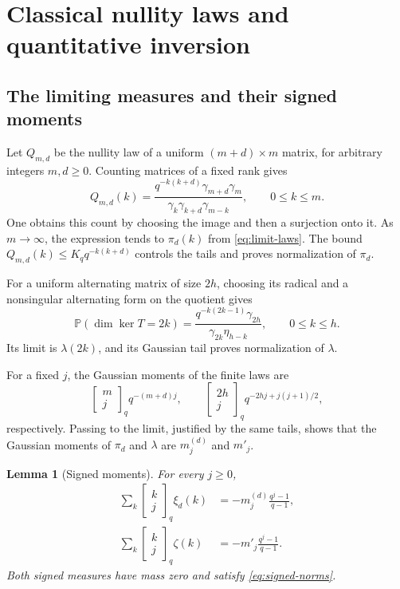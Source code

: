 \documentclass[11pt]{article}
\newtheorem{lemma}[theorem]{Lemma}
\theoremstyle{definition}
\theoremstyle{remark}
\newcommand{\Pp}{\mathbb P}
\newcommand{\gb}[2]{\begin{bmatrix}#1\\#2\end{bmatrix}_{q}}
\begin{document}
\section{Classical nullity laws and quantitative inversion}\label{sec:inversion}

\subsection{The limiting measures and their signed moments}

Let $Q_{m,d}$ be the nullity law of a uniform $(m+d)\times m$ matrix, for arbitrary integers $m,d\ge0$. Counting matrices of a fixed rank gives
\begin{equation}\label{eq:rectangular-finite}
 Q_{m,d}(k)=
 \frac{q^{-k(k+d)}\gamma_{m+d}\gamma_m}
 {\gamma_k\gamma_{k+d}\gamma_{m-k}},\qquad 0\le k\le m.
\end{equation}
One obtains this count by choosing the image and then a surjection onto it. As $m\to\infty$, the expression tends to $\pi_d(k)$ from \eqref{eq:limit-laws}. The bound $Q_{m,d}(k)\le K_qq^{-k(k+d)}$ controls the tails and proves normalization of $\pi_d$.

For a uniform alternating matrix of size $2h$, choosing its radical and a nonsingular alternating form on the quotient gives
\begin{equation}\label{eq:alternating-finite}
 \Pp(\dim\ker T=2k)
 =\frac{q^{-k(2k-1)}\gamma_{2h}}
 {\gamma_{2k}\eta_{h-k}},\qquad 0\le k\le h.
\end{equation}
Its limit is $\lambda(2k)$, and its Gaussian tail proves normalization of $\lambda$.

For a fixed $j$, the Gaussian moments of the finite laws are
\[
 \gb{m}{j}q^{-(m+d)j},\qquad
 \gb{2h}{j}q^{-2hj+j(j+1)/2},
\]
respectively. Passing to the limit, justified by the same tails, shows that the Gaussian moments of $\pi_d$ and $\lambda$ are $m_j^{(d)}$ and $m'_j$.

\begin{lemma}[Signed moments]\label{lem:signed-moments}
For every $j\ge0$,
\begin{align}
 \sum_k\gb{k}{j}\xi_d(k)
 &=-m_j^{(d)}\frac{q^j-1}{q-1},\label{eq:xi-moments}\\
 \sum_k\gb{k}{j}\zeta(k)
 &=-m'_j\frac{q^j-1}{q-1}.\label{eq:zeta-moments}
\end{align}
Both signed measures have mass zero and satisfy \eqref{eq:signed-norms}.
\end{lemma}
\end{document}
